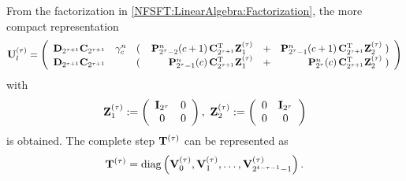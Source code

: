 From the factorization in \eqref{NFSFT:LinearAlgebra:Factorization}, the more compact representation
\begin{equation}
\nonumber
\mathbf{U}^{(\tau)}_l = 
\left(\begin{array}{lclrcr}
  \mathbf{D}_{2^{\tau+1}} \mathbf{C}_{2^{\tau+1}} & \gamma_{c}^n & \left(\right. & \mathbf{P}_{2^{\tau}-2}^n{\hspace{-0.4ex}}\left(c+1\right) \mathbf{C}^{\text{\rm{T}}}_{2^{\tau+1}} \mathbf{Z}_{1}^{(\tau)} & + & 
  \mathbf{P}_{2^{\tau}-1}^n{\hspace{-0.4ex}}\left(c+1\right) \mathbf{C}^{\text{\rm{T}}}_{2^{\tau+1}} \mathbf{Z}_{2}^{(\tau)} \left.\right) \\
  \mathbf{D}_{2^{\tau+1}} \mathbf{C}_{2^{\tau+1}} & & \left(\right. & \mathbf{P}_{2^{\tau}-1}^n{\hspace{-0.4ex}}\left(c\right) \mathbf{C}^{\text{\rm{T}}}_{2^{\tau+1}} \mathbf{Z}_{1}^{(\tau)} & + & 
  \mathbf{P}_{2^{\tau}}^n{\hspace{-0.4ex}}\left(c\right) \mathbf{C}^{\text{\rm{T}}}_{2^{\tau+1}} \mathbf{Z}_{2}^{(\tau)} \left.\right)
\end{array}\right)
\end{equation}
with 
\[
  \mathbf{Z}_{1}^{(\tau)} := 
    \left(\begin{array}{cc}
      \mathbf{I}_{2^{\tau}} & 0\\
      0 & 0
    \end{array}\right),\
  \mathbf{Z}_{2}^{(\tau)} := 
    \left(\begin{array}{cc}
      0 & \mathbf{I}_{2^{\tau}} \\
      0 & 0
    \end{array}\right)    
\]
is obtained.
The complete step $\mathbf{T}^{(\tau)}$ can be represented as 
\[
  \mathbf{T}^{(\tau)} = \text{diag}\left(\mathbf{V}^{(\tau)}_0,\mathbf{V}^{(\tau)}_1,\dots,\mathbf{V}^{(\tau)}_{2^{t-\tau-1}-1}\right).
\]

